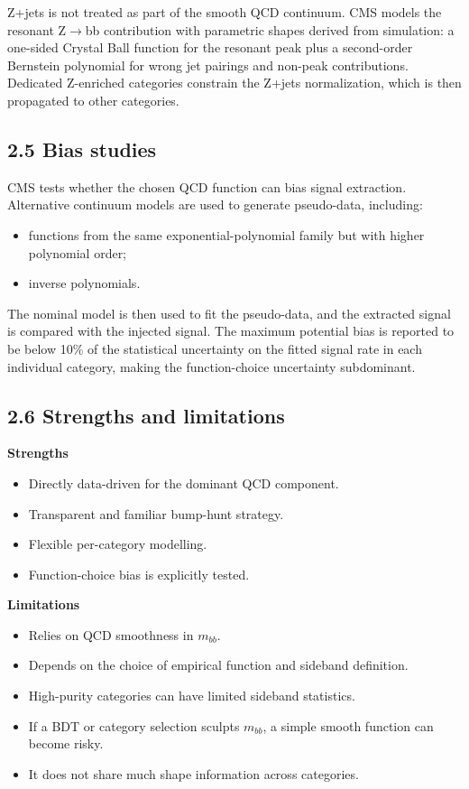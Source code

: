 \documentclass[11pt]{article}
\begin{document}
Z+jets is not treated as part of the smooth QCD continuum. CMS models the resonant Z$\to$bb contribution with parametric shapes derived from simulation: a one-sided Crystal Ball function for the resonant peak plus a second-order Bernstein polynomial for wrong jet pairings and non-peak contributions. Dedicated Z-enriched categories constrain the Z+jets normalization, which is then propagated to other categories.

\subsection{2.5 Bias studies}

CMS tests whether the chosen QCD function can bias signal extraction. Alternative continuum models are used to generate pseudo-data, including:

\begin{itemize}
\item functions from the same exponential-polynomial family but with higher polynomial order;
\item inverse polynomials.
\end{itemize}

The nominal model is then used to fit the pseudo-data, and the extracted signal is compared with the injected signal. The maximum potential bias is reported to be below 10\% of the statistical uncertainty on the fitted signal rate in each individual category, making the function-choice uncertainty subdominant.

\subsection{2.6 Strengths and limitations}

\textbf{Strengths}

\begin{itemize}
\item Directly data-driven for the dominant QCD component.
\item Transparent and familiar bump-hunt strategy.
\item Flexible per-category modelling.
\item Function-choice bias is explicitly tested.
\end{itemize}

\textbf{Limitations}

\begin{itemize}
\item Relies on QCD smoothness in \(m_{bb}\).
\item Depends on the choice of empirical function and sideband definition.
\item High-purity categories can have limited sideband statistics.
\item If a BDT or category selection sculpts \(m_{bb}\), a simple smooth function can become risky.
\item It does not share much shape information across categories.
\end{itemize}
\end{document}
